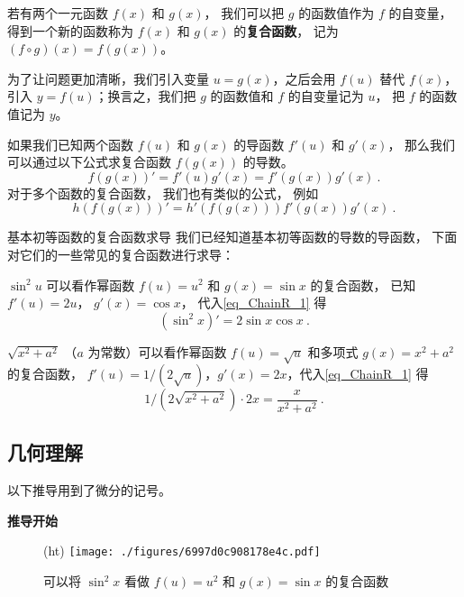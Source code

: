 

若有两个一元函数 $f(x)$ 和 $g(x)$， 我们可以把 $g$ 的函数值作为 $f$ 的自变量， 得到一个新的函数称为 $f(x)$ 和 $g(x)$ 的\textbf{复合函数}， 记为 $(f \circ g)(x) = f(g(x))$。

为了让问题更加清晰，我们引入变量 $u = g(x)$，之后会用 $f(u)$ 替代 $f(x)$，引入 $y = f(u)$；换言之，我们把 $g$ 的函数值和 $f$ 的自变量记为 $u$， 把 $f$ 的函数值记为 $y$。

如果我们已知两个函数 $f(u)$ 和 $g(x)$ 的导函数 $f'(u)$ 和 $g'(x)$， 那么我们可以通过以下公式求复合函数 $f(g(x))$ 的导数。
\begin{equation}\label{eq_ChainR_1}
f(g(x))' = f'(u) g'(x) = f'(g(x))g'(x)~.
\end{equation}
对于多个函数的复合函数， 我们也有类似的公式， 例如
\begin{equation}\label{eq_ChainR_5}
h(f(g(x)))' = h'(f(g(x)))f'(g(x))g'(x)~.
\end{equation}

\begin{example}{基本初等函数的复合函数求导}
我们已经知道基本初等函数的导数的导函数， 下面对它们的一些常见的复合函数进行求导：

$\sin^2 u$ 可以看作幂函数 $f(u) = u^2$ 和 $g(x) = \sin x$ 的复合函数， 已知 $f'(u) = 2u$， $g'(x) = \cos x$， 代入\autoref{eq_ChainR_1} 得
\begin{equation}
(\sin^2 x)' = 2\sin x \cos x~.
\end{equation}

$\sqrt{x^2 + a^2}$ （$a$ 为常数）可以看作幂函数 $f(u) = \sqrt{u}$ 和多项式 $g(x) = x^2 + a^2$ 的复合函数， $f'(u) = 1/(2\sqrt u)$，$g'(x) = 2 x$，代入\autoref{eq_ChainR_1} 得
\begin{equation}
1/(2\sqrt{x^2 + a^2}) \cdot 2 x = \frac{x}{x^2 + a^2}~.
\end{equation}
\end{example}

\subsection{几何理解}
以下推导用到了微分的记号。

\textbf{推导开始}

\begin{figure}(ht)
\centering
\texttt{[image: ./figures/6997d0c908178e4c.pdf]}
\caption{可以将 $\sin^2 x$ 看做 $f(u) = u^2$ 和 $g(x) = \sin x$ 的复合函数}\label{fig_ChainR_1}
\end{figure}

